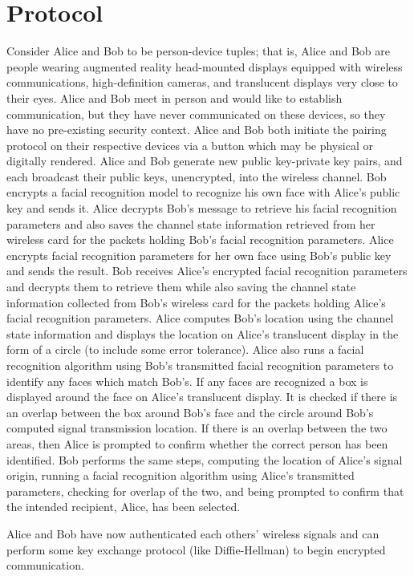 \documentclass[12pt]{report}
\begin{document}
\section{Protocol}
Consider Alice and Bob to be person-device tuples; that is, Alice and Bob are people wearing augmented reality head-mounted displays equipped with wireless communications, high-definition cameras, and translucent displays very close to their eyes. Alice and Bob meet in person and would like to establish communication, but they have never communicated on these devices, so they have no pre-existing security context. Alice and Bob both initiate the pairing protocol on their respective devices via a button which may be physical or digitally rendered. Alice and Bob generate new public key-private key pairs, and each broadcast their public keys, unencrypted, into the wireless channel. Bob encrypts a facial recognition model to recognize his own face with Alice's public key and sends it. Alice decrypts Bob's message to retrieve his facial recognition parameters and also saves the channel state information retrieved from her wireless card for the packets holding Bob's facial recognition parameters. Alice encrypts facial recognition parameters for her own face using Bob's public key and sends the result. Bob receives Alice's encrypted facial recognition parameters and decrypts them to retrieve them while also saving the channel state information collected from Bob's wireless card for the packets holding Alice's facial recognition parameters. Alice computes Bob's location using the channel state information and displays the location on Alice's translucent display in the form of a circle (to include some error tolerance). Alice also runs a facial recognition algorithm using Bob's transmitted facial recognition parameters to identify any faces which match Bob's. If any faces are recognized a box is displayed around the face on Alice's translucent display. It is checked if there is an overlap between the box around Bob's face and the circle around Bob's computed signal transmission location. If there is an overlap between the two areas, then Alice is prompted to confirm whether the correct person has been identified. Bob performs the same steps, computing the location of Alice's signal origin, running a facial recognition algorithm using Alice's transmitted parameters, checking for overlap of the two, and being prompted to confirm that the intended recipient, Alice, has been selected.

Alice and Bob have now authenticated each others' wireless signals and can perform some key exchange protocol (like Diffie-Hellman) to begin encrypted communication.
\end{document}
